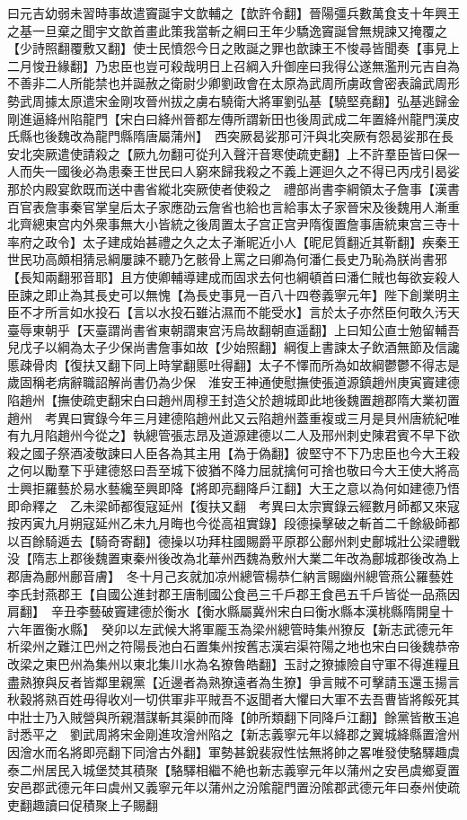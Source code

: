曰元吉幼弱未習時事故遣竇誕宇文歆輔之【歆許令翻】晉陽彊兵數萬食支十年興王之基一旦棄之聞宇文歆首畫此策我當斬之綱曰王年少驕逸竇誕曾無規諫又掩覆之【少詩照翻覆敷又翻】使士民憤怨今日之敗誕之罪也歆諫王不悛尋皆聞奏【事見上二月悛丑緣翻】乃忠臣也豈可殺哉明日上召綱入升御座曰我得公遂無濫刑元吉自為不善非二人所能禁也并誕赦之衛尉少卿劉政會在太原為武周所虜政會密表論武周形勢武周據太原遣宋金剛攻晉州拔之虜右驍衛大將軍劉弘基【驍堅堯翻】弘基逃歸金剛進逼絳州陷龍門【宋白曰絳州晉都左傳所謂新田也後周武成二年置絳州龍門漢皮氏縣也後魏改為龍門縣隋唐屬蒲州】　西突厥曷娑那可汗與北突厥有怨曷娑那在長安北突厥遣使請殺之【厥九勿翻可從刋入聲汗音寒使疏吏翻】上不許羣臣皆曰保一人而失一國後必為患秦王世民曰人窮來歸我殺之不義上遲迴久之不得已丙戌引曷娑那於内殿宴飲既而送中書省縱北突厥使者使殺之　禮部尚書李綱領太子詹事【漢書百官表詹事秦官掌皇后太子家應劭云詹省也給也言給事太子家晉宋及後魏用人漸重北齊總東宫内外衆事無大小皆統之後周置太子宫正宫尹隋復置詹事唐統東宫三寺十率府之政令】太子建成始甚禮之久之太子漸昵近小人【昵尼質翻近其靳翻】疾秦王世民功高頗相猜忌綱屢諫不聽乃乞骸骨上罵之曰卿為何潘仁長史乃恥為朕尚書邪【長知兩翻邪音耶】且方使卿輔導建成而固求去何也綱頓首曰潘仁賊也每欲妄殺人臣諫之即止為其長史可以無愧【為長史事見一百八十四卷義寧元年】陛下創業明主臣不才所言如水投石【言以水投石雖沾濕而不能受水】言於太子亦然臣何敢久汚天臺辱東朝乎【天臺謂尚書省東朝謂東宫汚烏故翻朝直遥翻】上曰知公直士勉留輔吾兒戊子以綱為太子少保尚書詹事如故【少始照翻】綱復上書諫太子飲酒無節及信讒慝疎骨肉【復扶又翻下同上時掌翻慝吐得翻】太子不懌而所為如故綱鬱鬱不得志是歲固稱老病辭職詔解尚書仍為少保　淮安王神通使慰撫使張道源鎮趙州庚寅竇建德陷趙州【撫使疏吏翻宋白曰趙州周穆王封造父於趙城即此地後魏置趙郡隋大業初置趙州　考異曰實錄今年三月建德陷趙州此又云陷趙州蓋重複或三月是貝州唐統紀唯有九月陷趙州今從之】執總管張志昂及道源建德以二人及邢州刺史陳君賓不早下欲殺之國子祭酒凌敬諫曰人臣各為其主用【為于偽翻】彼堅守不下乃忠臣也今大王殺之何以勵羣下乎建德怒曰吾至城下彼猶不降力屈就擒何可捨也敬曰今大王使大將高士興拒羅藝於易水藝纔至興即降【將即亮翻降戶江翻】大王之意以為何如建德乃悟即命釋之　乙未梁師都復寇延州【復扶又翻　考異曰太宗實錄云經數月師都又來寇按丙寅九月朔寇延州乙未九月晦也今從高祖實錄】段德操擊破之斬首二千餘級師都以百餘騎遁去【騎奇寄翻】德操以功拜柱國賜爵平原郡公鄜州刺史鄜城壯公梁禮戰没【隋志上郡後魏置東秦州後改為北華州西魏為敷州大業二年改為鄜城郡後改為上郡唐為鄜州鄜音膚】　冬十月己亥就加凉州總管楊恭仁納言賜幽州總管燕公羅藝姓李氏封燕郡王【自國公進封郡王唐制國公食邑三千戶郡王食邑五千戶皆從一品燕因肩翻】　辛丑李藝破竇建德於衡水【衡水縣屬冀州宋白曰衡水縣本漢桃縣隋開皇十六年置衡水縣】　癸卯以左武候大將軍龎玉為梁州總管時集州獠反【新志武德元年析梁州之難江巴州之符陽長池白石置集州按舊志漢宕渠符陽之地也宋白曰後魏恭帝改梁之東巴州為集州以東北集川水為名獠魯皓翻】玉討之獠據險自守軍不得進糧且盡熟獠與反者皆鄰里親黨【近邊者為熟獠遠者為生獠】爭言賊不可擊請玉還玉揚言秋穀將熟百姓毋得收刈一切供軍非平賊吾不返聞者大懼曰大軍不去吾曹皆將餒死其中壯士乃入賊營與所親潛謀斬其渠帥而降【帥所類翻下同降戶江翻】餘黨皆散玉追討悉平之　劉武周將宋金剛進攻澮州陷之【新志義寧元年以絳郡之翼城絳縣置澮州因澮水而名將即亮翻下同澮古外翻】軍勢甚銳裴寂性怯無將帥之畧唯發使駱驛趣虞泰二州居民入城堡焚其積聚【駱驛相繼不絶也新志義寧元年以蒲州之安邑虞鄉夏置安邑郡武德元年曰虞州又義寧元年以蒲州之汾隂龍門置汾隂郡武德元年曰泰州使疏吏翻趣讀曰促積聚上子賜翻